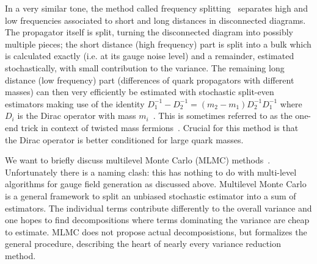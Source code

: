 
In a very similar tone, the method called frequency splitting~\cite{Giusti:2019kff,Giusti:2020dtz} separates high and low frequencies associated to short and long distances in disconnected diagrams.
The propagator itself is split, turning the disconnected diagram into possibly multiple pieces; the short distance (high frequency) part is split into a bulk which is calculated exactly (i.e. at its gauge noise level) and a remainder, estimated stochastically, with small contribution to the variance.
The remaining long distance (low frequency) part (differences of quark propagators with different masses) can then very efficiently be estimated with stochastic split-even estimators making use of the identity $D_1^{-1} - D_2^{-1} = (m_2 - m_1) D_2^{-1} D_1^{-1}$ where $D_i$ is the Dirac operator with mass $m_i$~\cite{Whyte:2022vrk}.
This is sometimes referred to as the one-end trick in context of twisted mass fermions~\cite{ETM:2008zte,PhysRevD.73.074506,PhysRevD.59.074503}.
Crucial for this method is that the Dirac operator is better conditioned for large quark masses.


We want to briefly discuss multilevel Monte Carlo (MLMC) methods~\cite{giles2008,Giles_2015}.
Unfortunately there is a naming clash: this has nothing to do with multi-level algorithms for gauge field generation as discussed above.
Multilevel Monte Carlo is a general framework to split an unbiased stochastic estimator into a sum of estimators.
The individual terms contribute differently to the overall variance and one hopes to find decompositions where terms dominating the variance are cheap to estimate.
MLMC does not propose actual decomposistions, but formalizes the general procedure, describing the heart of nearly every variance reduction method.


